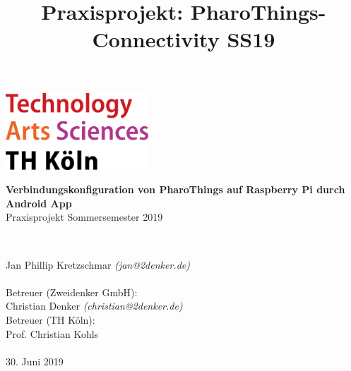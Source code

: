 \documentclass[12pt,a4paper]{article}
\title{Praxisprojekt: PharoThings-Connectivity SS19}
\begin{document}
	\begin{titlepage}
    \includegraphics[width=0.4\textwidth]{th_logo.png}
    ~\\[2.5cm]
    \begin{center}
    \textbf{\huge Verbindungskonfiguration von PharoThings auf Raspberry Pi durch Android App}\\[0.5cm]
    {\Large Praxisprojekt Sommersemester 2019}
    \vfill
    \end{center}
    ~\\[2.0cm]
    \begin{flushright}
    {\large Jan Phillip Kretzschmar \it{(jan@2denker.de)}}\\[0.1cm]
    ~\\[1.0cm]
    {\large Betreuer (Zweidenker GmbH):}\\[0.1cm]
    {\large Christian Denker \it{(christian@2denker.de)}}
    ~\\[0.5cm]
    {\large Betreuer (TH Köln):}\\[0.1cm]
    {\large Prof. Christian Kohls}\\[0.1cm]

	~\\[1.0cm]
    {\large 30. Juni 2019}
	\end{flushright}
    \end{titlepage}
    \tableofcontents
    \pagebreak
    
    
    
    
\end{document}
